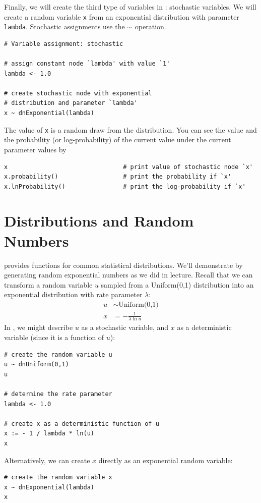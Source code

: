 Finally, we will create the third type of variables in \Rev: stochastic variables.
We will create a random variable \texttt{x} from an exponential distribution with parameter \texttt{lambda}.  
Stochastic assignments use the $\sim$ operation.
{\tt \begin{snugshade*}
\begin{lstlisting}     
# Variable assignment: stochastic

# assign constant node `lambda' with value `1'
lambda <- 1.0

# create stochastic node with exponential 
# distribution and parameter `lambda'
x ~ dnExponential(lambda)
\end{lstlisting}
\end{snugshade*}}
The value of \texttt{x} is a random draw from the distribution. 
You can see the value and the probability (or log-probability) of the current value under the current parameter values by
{\tt \begin{snugshade*}
\begin{lstlisting}    
x                                # print value of stochastic node `x'
x.probability()                  # print the probability if `x'
x.lnProbability()                # print the log-probability if `x'
\end{lstlisting}
\end{snugshade*}}

\section*{Distributions and Random Numbers}

\Rev provides functions for common statistical distributions.
We'll demonstrate by generating random exponential numbers as we did in lecture.
Recall that we can transform a random variable $u$ sampled from a Uniform(0,1) distribution into an exponential distribution with rate parameter $\lambda$:
\begin{align*}
	u &\sim \text{Uniform(0,1)}\\
	x &= -\frac{1}{\lambda \ln u}
\end{align*}
In \Rev, we might describe $u$ as a stochastic variable, and $x$ as a deterministic variable (since it is a function of $u$):
{\tt \begin{snugshade*}
\begin{lstlisting}
# create the random variable u
u ~ dnUniform(0,1)
u

# determine the rate parameter
lambda <- 1.0

# create x as a deterministic function of u
x := - 1 / lambda * ln(u)
x
\end{lstlisting}
\end{snugshade*}}
\noindent Alternatively, we can create $x$ directly as an exponential random variable:
{\tt \begin{snugshade*}
\begin{lstlisting}
# create the random variable x
x ~ dnExponential(lambda)
x
\end{lstlisting}
\end{snugshade*}}

